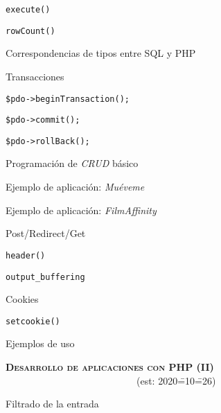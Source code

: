 \begin{longenum}
\begin{longenum}
\begin{longenum}
\begin{longenum}
                \item \texttt{execute()}
                \item \texttt{rowCount()}
            \end{longenum}
            \item Correspondencias de tipos entre SQL y PHP
            \item Transacciones 
            \begin{longenum}
                \item \texttt{\$pdo->beginTransaction();}
                \item \texttt{\$pdo->commit();}
                \item \texttt{\$pdo->rollBack();}
            \end{longenum}
        \end{longenum}
        \item Programación de \textit{CRUD} básico
        \begin{longenum}
            \item Ejemplo de aplicación: \textit{Muéveme}
            \item Ejemplo de aplicación: \textit{FilmAffinity}
        \end{longenum}
        \item Post/Redirect/Get
        \item \texttt{header()}
        \begin{longenum}
            \item \texttt{output\_buffering}
        \end{longenum}
        \item Cookies
        \begin{longenum}
            \item \texttt{setcookie()}
            \item Ejemplos de uso
        \end{longenum}
    \end{longenum}
    \item \textbf{\textsc{Desarrollo de aplicaciones con PHP (II)}} \ \ \ \ \ \ \ \ \ \ \ \ \ \ \ \ \ \ \ \ \ \ \ \ \ \ \ (est: 2020\==10\==26)
    \begin{longenum}
        \item Filtrado de la entrada
        \begin{longenum}

\end{longenum}
\end{longenum}
\end{longenum}
